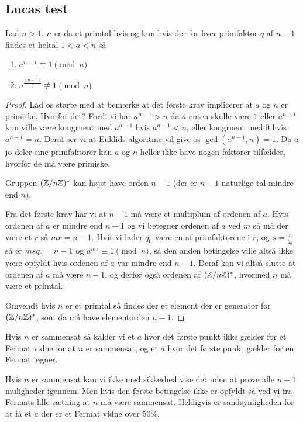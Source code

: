 \subsection{Lucas test}
\begin{theorem}
Lad $n > 1$. $n$ er da et primtal hvis og kun hvis der for hver primfaktor $q$ af $n-1$ findes et
heltal $1<a<n$ så
\begin{enumerate}
	\item $a^{n-1} \equiv 1 \pmod{n}$
	\item $a^{\frac{(n-1)}{q}} \not \equiv 1 \pmod{n}$
\end{enumerate}
\begin{proof}
	Lad os starte med at bemærke at det første krav implicerer at $a$ og $n$ er primiske.
	Hvorfor det? Fordi vi har $a^{n-1}>n$ da $a$ enten skulle være $1$ eller $a^{n-1}$ kun
	ville være kongruent med $a^{n-1}$ hvis $a^{n-1} < n$, eller kongruent med $0$ hvis
	$a^{n-1} = n$. Deraf ser vi at Euklids algoritme vil give os $\gcd(a^{n-1},n)=1$.
	Da $a$ jo deler sine primfaktorer kan $a$ og $n$ heller ikke have nogen faktorer tilfældes,
	hvorfor de må være primiske.

	Gruppen $(\mathbb{Z}/n\mathbb{Z})^*$ kan højst have orden $n-1$ (der er $n-1$ naturlige tal mindre end $n$).

	Fra det første krav har vi at $n-1$ må være et multiplum af ordenen af $a$.
	Hvis ordenen af $a$ er mindre end $n-1$ og vi betegner ordenen af $a$ ved $m$ så
	må der være et $r$ så $mr=n-1$. Hvis vi lader $q_0$ være en af primfaktorene i $r$, og
	$s = \frac{r}{q_0}$ så er $msq_0=n-1$ og $a^{ms} \equiv 1 \pmod{n}$, så den anden betingelse
	ville altså ikke være opfyldt hvis ordenen af $a$ var mindre end $n-1$. Deraf kan
	vi altså slutte at ordenen af $a$ må være $n-1$, og derfor også ordenen af
	$(\mathbb{Z}/n\mathbb{Z})^*$, hvormed $n$ må være et primtal.

	Omvendt hvis $n$ er et primtal så findes der et element der er generator for
	$(\mathbb{Z}/n\mathbb{Z})^*$, som da må have elementorden $n-1$.
\end{proof}
\end{theorem}

Hvis $n$ er sammensat så kalder vi et $a$ hvor det første punkt ikke gælder for et Fermat
vidne for at $n$ er sammensat, og et $a$ hvor det første punkt gælder for en Fermat løgner.

Hvis $n$ er sammensat kan vi ikke med sikkerhed vise det uden at prøve alle $n-1$ muligheder
igennem. Men hvis den første betingelse ikke er opfyldt så ved vi fra Fermats lille sætning
at $n$ må være sammensat. Heldigvis er sandsynligheden for at få et $a$ der er et Fermat vidne
over 50\%.

